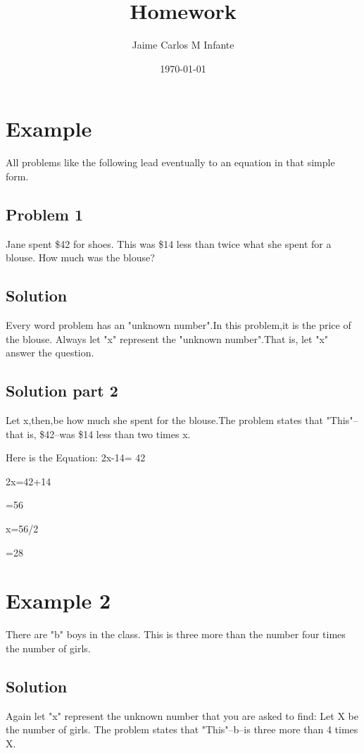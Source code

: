 \documentclass[12pt]{article}%
\begin{document}
\title{Homework}
\author{Jaime Carlos M Infante}
\date{\today}
\maketitle
\section{Example}

        

All problems like the following lead eventually to an equation in that simple form.
 

\subsection{Problem 1}
Jane spent \$42 for shoes. This was \$14 less than twice what she spent for a blouse. How much was the blouse?
\subsection{Solution}
Every word problem has an "unknown number".In this problem,it is the price of the blouse. Always let "x" represent the "unknown number".That is, let "x" answer the question.
\subsection{Solution part 2}
Let x,then,be how much she spent for the blouse.The problem states that "This"--that is, \$42--was \$14 less than two times x.

           Here is the Equation: 2x-14= 42
                                 
                                 2x=42+14
                                 
                                 =56
                                 
                                 x=56/2
                                 
                                 =28





\section{Example 2}
There are "b" boys in the class. This is three more than the number four times the number of girls.
\subsection {Solution}
Again let "x" represent the unknown number that you are asked to find: Let X be the number of girls. The problem states that "This"--b--is three more than 4 times X. 
          
\end{document}
